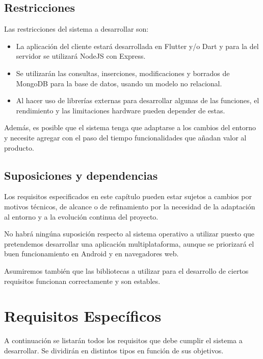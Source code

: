 \subsection{Restricciones}

Las restricciones del sistema a desarrollar son:
\begin{itemize}
    \item La aplicación del cliente estará desarrollada en Flutter y/o Dart y para la del servidor se utilizará NodeJS con Express.
    \item Se utilizarán las consultas, inserciones, modificaciones y borrados de MongoDB para la base de datos, usando un modelo no relacional.
    \item Al hacer uso de librerías externas para desarrollar algunas de las funciones, el rendimiento y las limitaciones hardware pueden depender de estas.
\end{itemize}


Además, es posible que el sistema tenga que adaptarse a los cambios del entorno y necesite agregar con el paso del tiempo funcionalidades que añadan valor
al producto.


\subsection{Suposiciones y dependencias}
Los requisitos especificados en este capítulo pueden estar sujetos a cambios por motivos técnicos, de alcance o de refinamiento por la necesidad de la adaptación
al entorno y a la evolución continua del proyecto.

No habrá ningúna suposición respecto al sistema operativo a utilizar puesto que pretendemos desarrollar una aplicación multiplataforma, aunque se priorizará el buen funcionamiento en Android y en navegadores web.

Asumiremos también que las bibliotecas a utilizar para el desarrollo de ciertos requisitos funcionan correctamente y son estables.

\section{Requisitos Específicos}
A continuación se listarán todos los requisitos que debe cumplir el sistema a desarrollar. Se dividirán en distintos tipos en función de sus objetivos.

